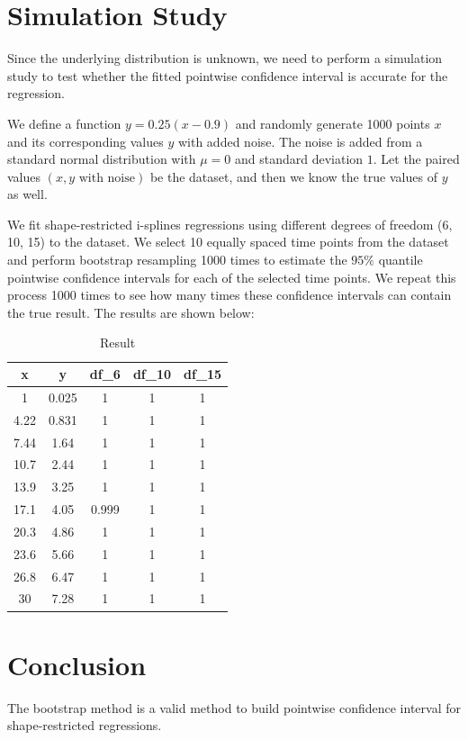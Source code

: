 \documentclass[12pt]{article}
\begin{document}
\section{Simulation Study}
\label{Simulation Study}

Since the underlying distribution is unknown, we need to perform a simulation
study to test whether the fitted pointwise confidence interval is accurate for 
the regression.

We define a function \(y = 0.25(x - 0.9)\) and randomly generate 1000 points
\(x\) and its corresponding values \(y\) with added noise. The noise is added 
from a standard normal distribution with \(\mu = 0\) and standard deviation
\(1\). Let the paired values \((x, y\text{ with noise})\) be the dataset, 
and then we know the true values of \(y\) as well.

We fit shape-restricted i-splines regressions using different degrees of 
freedom (6, 10, 15) to the dataset. We select 10 equally spaced time points
from the dataset and perform bootstrap resampling 1000 times to estimate 
the \(95\%\) quantile pointwise confidence intervals for each of the selected
time points. We repeat this process 1000 times to see how many times these 
confidence intervals can contain the true result. The results are shown below:



\begin{table}[ht]
  \centering
  \caption{Result}
\begin{tabular}{|c|c|c|c|c|}
    \hline
\textbf{x} & \textbf{y} & \textbf{df\_6} & \textbf{df\_10} & \textbf{df\_15} \\
    \hline
    1 & 0.025 & 1 & 1 & 1 \\
    \hline
    4.22 & 0.831 & 1 & 1 & 1 \\
    \hline
    7.44 & 1.64 & 1 & 1 & 1 \\
    \hline
    10.7 & 2.44 & 1 & 1 & 1 \\
    \hline
    13.9 & 3.25 & 1 & 1 & 1 \\
    \hline
    17.1 & 4.05 & 0.999 & 1 & 1 \\
    \hline
    20.3 & 4.86 & 1 & 1 & 1 \\
    \hline
    23.6 & 5.66 & 1 & 1 & 1 \\
    \hline
    26.8 & 6.47 & 1 & 1 & 1 \\
    \hline
    30 & 7.28 & 1 & 1 & 1 \\
    \hline
  \end{tabular}
\end{table}


\section{Conclusion}
\label{Conclusion}

The bootstrap method is a valid method to build pointwise confidence interval 
for shape-restricted regressions.



\end{document}
